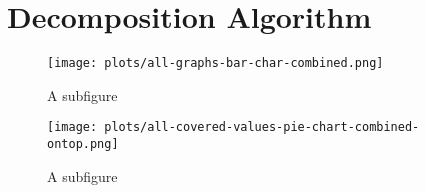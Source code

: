 
\chapter{Decomposition Algorithm}
\label{ch:Conceptual Design}

\begin{figure}
	\texttt{[image: plots/all-graphs-bar-char-combined.png]}
	\caption{A subfigure}
	\label{fig:sub1}
\end{figure}

\begin{figure}
		\texttt{[image: plots/all-covered-values-pie-chart-combined-ontop.png]}
		\caption{A subfigure}
		\label{fig:sub1}
\end{figure}








